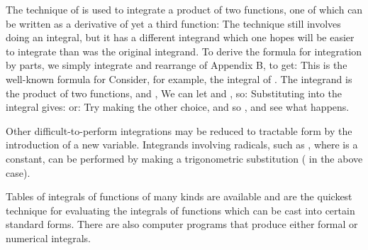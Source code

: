 {
The technique of 
is used to integrate a product of two functions, one of which can be written as a derivative
of yet a third function:
%
%
The technique still involves doing an integral, but it has a different integrand which
one hopes will be easier to integrate than was the original integrand.
To derive the formula for integration by parts, we simply integrate and rearrange
 of Appendix B,
%
%
to get:
%
%
This is the well-known formula for 
%
%
Consider, for example, the integral of .
The integrand is the product of two functions,  and ,
We can let  and , so:
%
%
Substituting into the integral gives:
%
%
or:
%
%
\tryit Try making the other choice,  and 
so , and see what happens.

Other difficult-to-perform integrations may be reduced to tractable
form by the introduction of a new variable.
Integrands involving radicals, such as ,
where  is a constant, can be performed by making a trigonometric
substitution ( in the above case).

Tables of integrals of functions of many kinds are available and are the
quickest technique for evaluating the integrals of functions which can be
cast into certain standard forms.
%
%
There are also computer programs that produce either formal or numerical
integrals.
%

}
